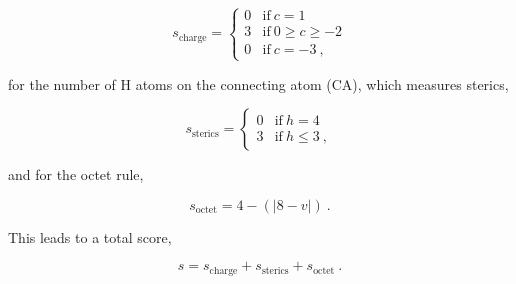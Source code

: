 \documentclass[]{article}
\begin{document}
\begin{equation}
	s_{\textrm{charge}} = 
	\begin{cases}
	0	&	\mathrm{if}~ c = 1 \\
	3	&	\mathrm{if}~ 0 \geq c \geq -2 \\
	0   &	\mathrm{if}~ c = -3 ~,
	\end{cases}
\end{equation}

for the number of H atoms on the connecting atom (CA), which measures sterics,

\begin{equation}
	s_{\textrm{sterics}} = 
	\begin{cases}
	0	&	\mathrm{if}~ h = 4 \\
	3	&	\mathrm{if}~ h \leq 3 ~,
	\end{cases}
\end{equation}

and for the octet rule,

\begin{equation}
	s_{\textrm{octet}} = 
	4 - (|8-v|) ~.
\end{equation}

This leads to a total score,

\begin{equation}
	s = s_{\textrm{charge}} + s_{\textrm{sterics}} + s_{\textrm{octet}} ~.
\end{equation}
\end{document}
